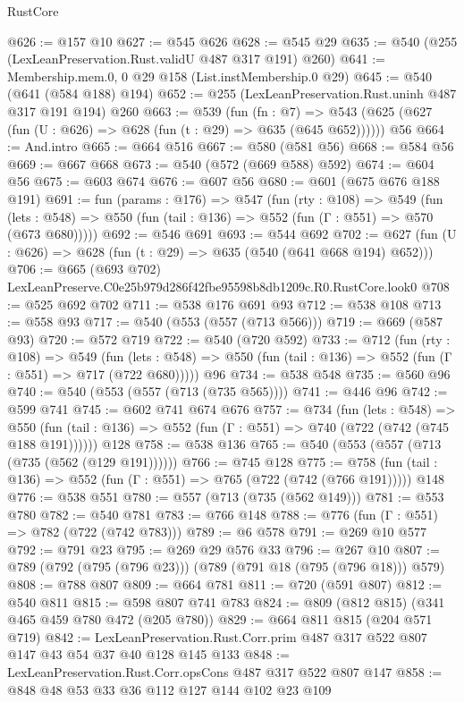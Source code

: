 \begin{lexlean}{RustCore}
\begin{coremodule}
@626 := @157 @10
@627 := @545 @626
@628 := @545 @29
@635 := @540 (@255 (LexLeanPreservation.Rust.validU @487 @317 @191) @260)
@641 := Membership.mem.{0, 0} @29 @158 (List.instMembership.{0} @29)
@645 := @540 (@641 (@584 @188) @194)
@652 := @255 (LexLeanPreservation.Rust.uninh @487 @317 @191 @194) @260
@663 := @539
    (fun (fn : @7) =>
    @543 (@625 (@627 (fun (U : @626) => @628 (fun (t : @29) => @635 (@645 @652))))))
    @56
@664 := And.intro
@665 := @664 @516
@667 := @580 (@581 @56)
@668 := @584 @56
@669 := @667 @668
@673 := @540 (@572 (@669 @588) @592)
@674 := @604 @56
@675 := @603 @674
@676 := @607 @56
@680 := @601 (@675 @676 @188 @191)
@691 := fun (params : @176) =>
  @547
    (fun (rty : @108) =>
    @549
      (fun (lets : @548) => @550 (fun (tail : @136) => @552 (fun (Γ : @551) => @570 (@673 @680)))))
@692 := @546 @691
@693 := @544 @692
@702 := @627 (fun (U : @626) => @628 (fun (t : @29) => @635 (@540 (@641 @668 @194) @652)))
@706 := @665 (@693 @702) LexLeanPreserve.C0e25b979d286f42fbe95598b8db1209c.R0.RustCore.look0
@708 := @525 @692 @702
@711 := @538 @176 @691 @93
@712 := @538 @108
@713 := @558 @93
@717 := @540 (@553 (@557 (@713 @566)))
@719 := @669 (@587 @93)
@720 := @572 @719
@722 := @540 (@720 @592)
@733 := @712
    (fun (rty : @108) =>
    @549
      (fun (lets : @548) => @550 (fun (tail : @136) => @552 (fun (Γ : @551) => @717 (@722 @680)))))
    @96
@734 := @538 @548
@735 := @560 @96
@740 := @540 (@553 (@557 (@713 (@735 @565))))
@741 := @446 @96
@742 := @599 @741
@745 := @602 @741 @674 @676
@757 := @734
    (fun (lets : @548) =>
    @550 (fun (tail : @136) => @552 (fun (Γ : @551) => @740 (@722 (@742 (@745 @188 @191))))))
    @128
@758 := @538 @136
@765 := @540 (@553 (@557 (@713 (@735 (@562 (@129 @191))))))
@766 := @745 @128
@775 := @758 (fun (tail : @136) => @552 (fun (Γ : @551) => @765 (@722 (@742 (@766 @191))))) @148
@776 := @538 @551
@780 := @557 (@713 (@735 (@562 @149)))
@781 := @553 @780
@782 := @540 @781
@783 := @766 @148
@788 := @776 (fun (Γ : @551) => @782 (@722 (@742 @783)))
@789 := @6 @578
@791 := @269 @10 @577
@792 := @791 @23
@795 := @269 @29 @576 @33
@796 := @267 @10
@807 := @789 (@792 (@795 (@796 @23))) (@789 (@791 @18 (@795 (@796 @18))) @579)
@808 := @788 @807
@809 := @664 @781
@811 := @720 (@591 @807)
@812 := @540 @811
@815 := @598 @807 @741 @783
@824 := @809 (@812 @815) (@341 @465 @459 @780 @472 (@205 @780))
@829 := @664 @811 @815 (@204 @571 @719)
@842 := LexLeanPreservation.Rust.Corr.prim @487 @317 @522 @807 @147 @43 @54 @37 @40 @128 @145 @133
@848 := LexLeanPreservation.Rust.Corr.opsCons @487 @317 @522 @807 @147
@858 := @848 @48 @53 @33 @36 @112 @127 @144 @102 @23 @109

\end{coremodule}
\end{lexlean}
